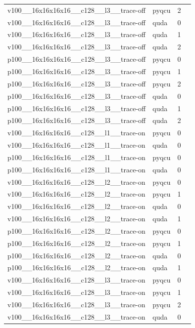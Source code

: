 \begin{table}[htbp]
\begin{tabular}{@{}llrr@{}}
v100\_\_16x16x16x16\_\_c128\_\_l3\_\_trace-off & pyqcu & 2 &  \\
v100\_\_16x16x16x16\_\_c128\_\_l3\_\_trace-off & quda & 0 &  \\
v100\_\_16x16x16x16\_\_c128\_\_l3\_\_trace-off & quda & 1 &  \\
v100\_\_16x16x16x16\_\_c128\_\_l3\_\_trace-off & quda & 2 &  \\
p100\_\_16x16x16x16\_\_c128\_\_l3\_\_trace-off & pyqcu & 0 &  \\
p100\_\_16x16x16x16\_\_c128\_\_l3\_\_trace-off & pyqcu & 1 &  \\
p100\_\_16x16x16x16\_\_c128\_\_l3\_\_trace-off & pyqcu & 2 &  \\
p100\_\_16x16x16x16\_\_c128\_\_l3\_\_trace-off & quda & 0 &  \\
p100\_\_16x16x16x16\_\_c128\_\_l3\_\_trace-off & quda & 1 &  \\
p100\_\_16x16x16x16\_\_c128\_\_l3\_\_trace-off & quda & 2 &  \\
v100\_\_16x16x16x16\_\_c128\_\_l1\_\_trace-on & pyqcu & 0 &  \\
v100\_\_16x16x16x16\_\_c128\_\_l1\_\_trace-on & quda & 0 &  \\
p100\_\_16x16x16x16\_\_c128\_\_l1\_\_trace-on & pyqcu & 0 &  \\
p100\_\_16x16x16x16\_\_c128\_\_l1\_\_trace-on & quda & 0 &  \\
v100\_\_16x16x16x16\_\_c128\_\_l2\_\_trace-on & pyqcu & 0 &  \\
v100\_\_16x16x16x16\_\_c128\_\_l2\_\_trace-on & pyqcu & 1 &  \\
v100\_\_16x16x16x16\_\_c128\_\_l2\_\_trace-on & quda & 0 &  \\
v100\_\_16x16x16x16\_\_c128\_\_l2\_\_trace-on & quda & 1 &  \\
p100\_\_16x16x16x16\_\_c128\_\_l2\_\_trace-on & pyqcu & 0 &  \\
p100\_\_16x16x16x16\_\_c128\_\_l2\_\_trace-on & pyqcu & 1 &  \\
p100\_\_16x16x16x16\_\_c128\_\_l2\_\_trace-on & quda & 0 &  \\
p100\_\_16x16x16x16\_\_c128\_\_l2\_\_trace-on & quda & 1 &  \\
v100\_\_16x16x16x16\_\_c128\_\_l3\_\_trace-on & pyqcu & 0 &  \\
v100\_\_16x16x16x16\_\_c128\_\_l3\_\_trace-on & pyqcu & 1 &  \\
v100\_\_16x16x16x16\_\_c128\_\_l3\_\_trace-on & pyqcu & 2 &  \\
v100\_\_16x16x16x16\_\_c128\_\_l3\_\_trace-on & quda & 0 &  \\

\end{tabular}
\end{table}
